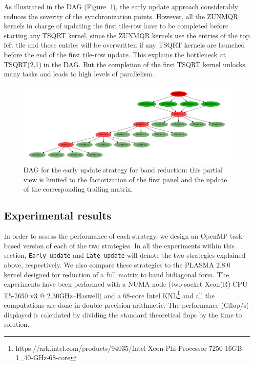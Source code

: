 As illustrated in the DAG (Figure~\ref{fig:dag_tile}),
the early update approach considerably reduces the severity of the
synchronization points.
However,
all the ZUNMQR kernels in charge of updating the
first tile-row have to be completed before starting
any TSQRT kernel,
since the ZUNMQR kernels use the entries of the top left tile and
those entries will be overwritten if any TSQRT kernels are
launched before the end of the first tile-row update.
This explains the bottleneck at TSQRT(2,1) in the DAG.
But the completion of the first TSQRT kernel unlocks many tasks
and leads to high levels of parallelism.


\begin{figure}[h!]
  \begin{center}
    \includegraphics[width=1\textwidth]{fig/dag_tile}
  \end{center}
  \caption{DAG for the early update strategy for band reduction:
    this partial view is limited to the factorization of the first panel and
    the update of the corresponding trailing matrix.}
  \label{fig:dag_tile}
\end{figure}

\subsection{Experimental results}
In order to assess the performance of each strategy,
we design an OpenMP task-based version of each of the two strategies.
In all the experiments within this section,
\texttt{Early update} and \texttt{Late update} will denote
the two strategies explained above, respectively.
We also compare these strategies to the PLASMA 2.8.0 kernel
designed for reduction of a full matrix to band bidiagonal form.
The experiments have been performed with a
NUMA node (two-socket Xeon(R) CPU E5-2650 v3 @ 2.30GHz--Haswell)
and a 68-core
Intel KNL\footnote{https://ark.intel.com/products/94035/Intel-Xeon-Phi-Processor-7250-16GB-1\_40-GHz-68-core}
and all the computations are done in double precision arithmetic.
The performance (Gflop/s) displayed is calculated by dividing the
standard theoretical flops by the time to solution.

